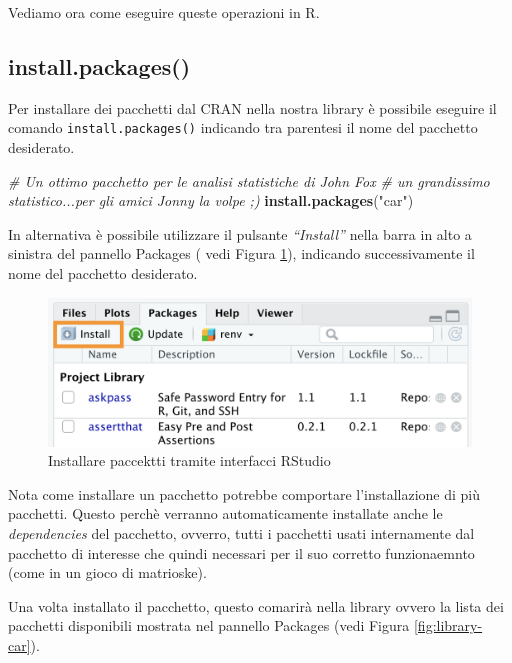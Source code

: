 \documentclass[
]{book}
\newenvironment{Shaded}{\begin{snugshade}}{\end{snugshade}}
\newcommand{\CommentTok}[1]{\textcolor[rgb]{0.56,0.35,0.01}{\textit{#1}}}
\newcommand{\KeywordTok}[1]{\textcolor[rgb]{0.13,0.29,0.53}{\textbf{#1}}}
\newcommand{\NormalTok}[1]{#1}
\newcommand{\StringTok}[1]{\textcolor[rgb]{0.31,0.60,0.02}{#1}}
\begin{document}
Vediamo ora come eseguire queste operazioni in R.

\hypertarget{install.packages}{%
\subsection{install.packages()}\label{install.packages}}

Per installare dei pacchetti dal CRAN nella nostra library è possibile eseguire il comando \texttt{install.packages()} indicando tra parentesi il nome del pacchetto desiderato.

\begin{Shaded}
\begin{Highlighting}[]
\CommentTok{# Un ottimo pacchetto per le analisi statistiche di John Fox}
\CommentTok{# un grandissimo statistico...per gli amici Jonny la volpe ;)}
\KeywordTok{install.packages}\NormalTok{(}\StringTok{"car"}\NormalTok{)}
\end{Highlighting}
\end{Shaded}

In alternativa è possibile utilizzare il pulsante \emph{``Install''} nella barra in alto a sinistra del pannello Packages ( vedi Figura \ref{fig:packages-install}), indicando successivamente il nome del pacchetto desiderato.

\begin{figure}

{\centering \includegraphics[width=0.65\linewidth]{images/packages-install} 

}

\caption{Installare paccektti tramite interfacci RStudio}\label{fig:packages-install}
\end{figure}

Nota come installare un pacchetto potrebbe comportare l'installazione di più pacchetti. Questo perchè verranno automaticamente installate anche le \emph{dependencies} del pacchetto, ovverro, tutti i pacchetti usati internamente dal pacchetto di interesse che quindi necessari per il suo corretto funzionaemnto (come in un gioco di matrioske).

Una volta installato il pacchetto, questo comarirà nella library ovvero la lista dei pacchetti disponibili mostrata nel pannello Packages (vedi Figura \ref{fig:library-car}).
\end{document}
